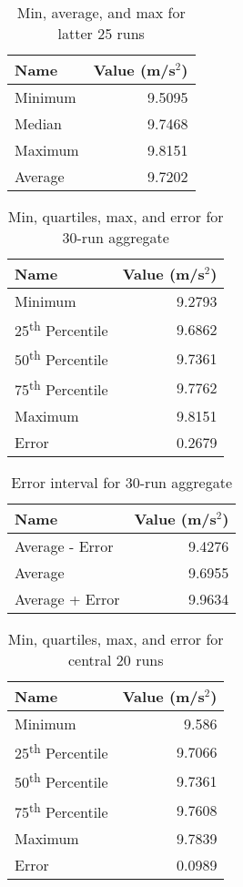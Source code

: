 %
\begin{table}[ht]
    \centering
    \begin{tabular}{l|r}
        \textbf{Name} & \textbf{Value} (m/s$^{2}$) \\
        \hline
        Minimum & 9.5095 \\
        Median & 9.7468 \\
        Maximum & 9.8151 \\
        Average & 9.7202 \\
        \hline
    \end{tabular}
    \caption{Min, average, and max for latter 25 runs}
    \label{table:01.describe.25}
\end{table}
%
\begin{table}[ht]
    \centering
    \begin{tabular}{l|r}
        \textbf{Name} & \textbf{Value} (m/s$^{2}$) \\
        \hline
        Minimum & 9.2793 \\
        25\textsuperscript{th} Percentile & 9.6862 \\
        50\textsuperscript{th} Percentile & 9.7361 \\
        75\textsuperscript{th} Percentile & 9.7762 \\
        Maximum & 9.8151 \\
        Error & 0.2679 \\
        \hline
    \end{tabular}
    \caption{Min, quartiles, max, and error for 30-run aggregate}
    \label{table:01.describe.30}
\end{table}
%
\begin{table}[ht]
    \centering
    \begin{tabular}{l|r}
        \textbf{Name} & \textbf{Value} (m/s$^{2}$) \\
        \hline
        Average - Error & 9.4276 \\
        Average & 9.6955 \\
        Average + Error & 9.9634 \\
        \hline
    \end{tabular}
    \caption{Error interval for 30-run aggregate}
    \label{table:01.error.30}
\end{table}
%
\begin{table}[ht]
    \centering
    \begin{tabular}{l|r}

        \textbf{Name} & \textbf{Value} (m/s$^{2}$) \\
        \hline
        Minimum & 9.586 \\
        25\textsuperscript{th} Percentile & 9.7066 \\
        50\textsuperscript{th} Percentile & 9.7361 \\
        75\textsuperscript{th} Percentile & 9.7608 \\
        Maximum & 9.7839 \\
        Error & 0.0989 \\
        \hline
    \end{tabular}
    \caption{Min, quartiles, max, and error for central 20 runs}
    \label{table:01.describe.20.center}
\end{table}
